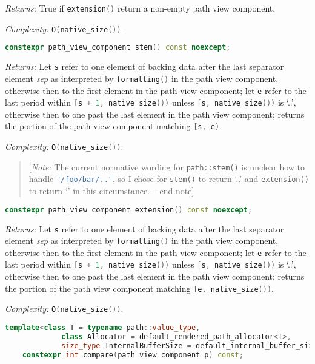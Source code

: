 \documentclass[11pt]{article}
\newcommand{\code}[2][cpp]{\lstinline[language=#1,basicstyle=\small\ttfamily]{#2}}
\newcommand{\desc}[1]{\textit{#1}}
\newcommand{\returns}{\desc{Returns: }}
\newcommand{\complexity}{\desc{Complexity: }}
\newcommand{\note}[1]{\begin{quote}[\textit{Note:} #1 -- end note]\end{quote}}
\begin{document}
\returns True if \code{extension()} return a non-empty path view component.

\complexity \code{O(native_size())}.\\

\begin{lstlisting}[language=cpp]
    constexpr path_view_component stem() const noexcept;
\end{lstlisting}

\returns Let \code{s} refer to one element of backing data after the last separator element \emph{sep} as interpreted by \code{formatting()} in the path view component, otherwise then to the first element in the path view component; let \code{e} refer to the last period within \code{[s + 1, native_size())} unless \code{[s, native_size())} is `..', otherwise then to one past the last element in the path view component; returns the portion of the path view component matching \code{[s, e)}.

\complexity \code{O(native_size())}.\\

\color{black}

\note{The current normative wording for \code{path::stem()} is unclear how to handle \code{"/foo/bar/.."}, so I chose for \code{stem()} to return `..' and \code{extension()} to return `' in this circumstance.}

\color{darkgreen}

\begin{lstlisting}[language=cpp]
    constexpr path_view_component extension() const noexcept;
\end{lstlisting}

\returns Let \code{s} refer to one element of backing data after the last separator element \emph{sep} as interpreted by \code{formatting()} in the path view component, otherwise then to the first element in the path view component; let \code{e} refer to the last period within \code{[s + 1, native_size())} unless \code{[s, native_size())} is `..', otherwise then to one past the last element in the path view component; returns the portion of the path view component matching \code{[e, native_size())}.

\complexity \code{O(native_size())}.\\

\begin{lstlisting}[language=cpp]
    template<class T = typename path::value_type,
             class Allocator = default_rendered_path_allocator<T>,
             size_type InternalBufferSize = default_internal_buffer_size>
    constexpr int compare(path_view_component p) const;
\end{lstlisting}
\end{document}
